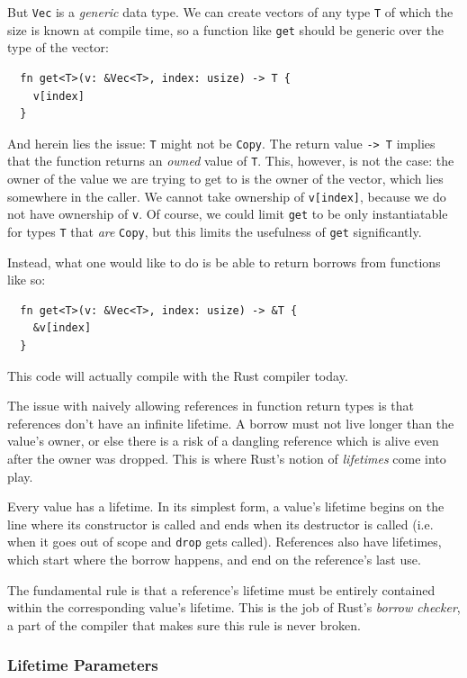 \documentclass[sigplan,11pt,screen,nonacm]{acmart}
\newcommand*{\Copy}{\texttt{Copy}}
\begin{document}
But \texttt{Vec} is a \emph{generic} data type. We can create vectors of any type \texttt{T} of which the size is known at compile time, so a function like \texttt{get} should be generic over the type of the vector:
\begin{verbatim}
  fn get<T>(v: &Vec<T>, index: usize) -> T {
    v[index]
  }
\end{verbatim}
And herein lies the issue: \texttt{T} might not be \Copy{}. The return value \texttt{-> T} implies that the function returns an \emph{owned} value of \texttt{T}. This, however, is not the case: the owner of the value we are trying to get to is the owner of the vector, which lies somewhere in the caller. We cannot take ownership of \texttt{v[index]}, because we do not have ownership of \texttt{v}. Of course, we could limit \texttt{get} to be only instantiatable for types \texttt{T} that \emph{are} \Copy{}, but this limits the usefulness of \texttt{get} significantly.

Instead, what one would like to do is be able to return borrows from functions like so:
\begin{verbatim}
  fn get<T>(v: &Vec<T>, index: usize) -> &T {
    &v[index]
  }
\end{verbatim}
This code will actually compile with the Rust compiler today.

The issue with naively allowing references in function return types is that references don't have an infinite lifetime. A borrow must not live longer than the value's owner, or else there is a risk of a dangling reference which is alive even after the owner was dropped. This is where Rust's notion of \emph{lifetimes} come into play.

Every value has a lifetime. In its simplest form, a value's lifetime begins on the line where its constructor is called and ends when its destructor is called (i.e. when it goes out of scope and \texttt{drop} gets called). References also have lifetimes, which start where the borrow happens, and end on the reference's last use.~\cite{rust:nll-intro}

The fundamental rule is that a reference's lifetime must be entirely contained within the corresponding value's lifetime. This is the job of Rust's \emph{borrow checker}, a part of the compiler that makes sure this rule is never broken.

\subsubsection{Lifetime Parameters}
\end{document}
